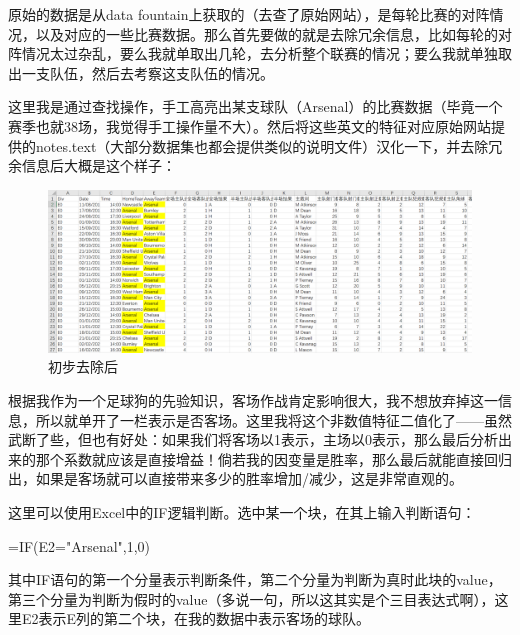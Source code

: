 \documentclass[10pt, a4paper]{article}
\begin{document}
原始的数据是从data fountain上获取的（去查了原始网站），是每轮比赛的对阵情况，以及对应的一些比赛数据。那么首先要做的就是去除冗余信息，比如每轮的对阵情况太过杂乱，要么我就单取出几轮，去分析整个联赛的情况；要么我就单独取出一支队伍，然后去考察这支队伍的情况。\par
这里我是通过查找操作，手工高亮出某支球队（Arsenal）的比赛数据（毕竟一个赛季也就38场，我觉得手工操作量不大）。然后将这些英文的特征对应原始网站提供的notes.text（大部分数据集也都会提供类似的说明文件）汉化一下，并去除冗余信息后大概是这个样子：
\begin{figure}[H]
    \centering
    \includegraphics[width=\linewidth]{first.png}
    \caption{初步去除后}
    \label{fig:first}
\end{figure}\par
根据我作为一个足球狗的先验知识，客场作战肯定影响很大，我不想放弃掉这一信息，所以就单开了一栏表示是否客场。这里我将这个非数值特征二值化了——虽然武断了些，但也有好处：如果我们将客场以1表示，主场以0表示，那么最后分析出来的那个系数就应该是直接增益！倘若我的因变量是胜率，那么最后就能直接回归出，如果是客场就可以直接带来多少的胜率增加/减少，这是非常直观的。\par
这里可以使用Excel中的IF逻辑判断。选中某一个块，在其上输入判断语句：
\begin{center}
    =IF(E2="Arsenal",1,0)
\end{center}
其中IF语句的第一个分量表示判断条件，第二个分量为判断为真时此块的value，第三个分量为判断为假时的value（多说一句，所以这其实是个三目表达式啊），这里E2表示E列的第二个块，在我的数据中表示客场的球队。\par
\end{document}
